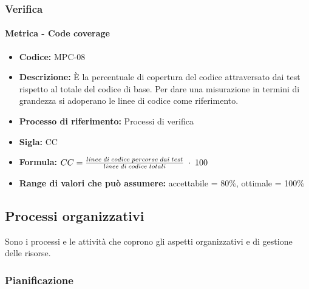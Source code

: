 \subsubsection{Verifica}
    \paragraph{Metrica - Code coverage}
    \begin{itemize}
        \item \textbf{Codice:} MPC-08
        \item \textbf{Descrizione:} È la percentuale di copertura del codice attraversato dai test rispetto al totale del codice di base. Per dare una misurazione in termini di grandezza si adoperano le linee di codice come riferimento.
        \item \textbf{Processo di riferimento:} Processi di verifica
        \item \textbf{Sigla:} CC
        \item \textbf{Formula:} \begin{math}{CC = {linee \; di \; codice \; percorse \; dai  \; test \over linee \; di \; codice \; totali} \; \cdot \; 100}\end{math}
        \item \textbf{Range di valori che può assumere:} accettabile = 80\%, ottimale = 100\%
    \end{itemize}

\subsection{Processi organizzativi}
Sono i processi e le attività che coprono gli aspetti organizzativi e di gestione delle risorse.

\subsubsection{Pianificazione}
